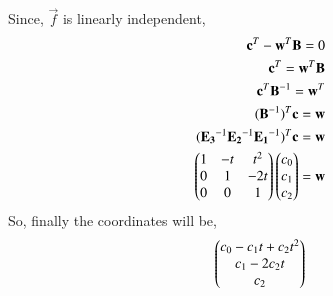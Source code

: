 \documentclass[journal,12pt,twocolumn]{IEEEtran}
\begin{document}
  Since, $\vec{f}$ is linearly independent,
  \begin{align}
  \mathbf{c}^T-\mathbf{w}^T\mathbf{B}=0\\
  \mathbf{c}^T=\mathbf{w}^T\mathbf{B}\\
  \mathbf{c}^T\mathbf{B}^{-1}=\mathbf{w}^T\\
   (\mathbf{B}^{-1})^T\mathbf{c}=\mathbf{w}\\
  (\mathbf{E_3}^{-1}\mathbf{E_2}^{-1}\mathbf{E_1}^{-1})^T\mathbf{c}=\mathbf{w}\\
  \begin{pmatrix}1&-t&t^2\\0&1&-2t\\0&0&1\end{pmatrix}\begin{pmatrix}c_0\\c_1\\c_2\end{pmatrix}=\mathbf{w}
  \end{align} 
  So, finally the coordinates will be,
  \begin{align}
  \begin{pmatrix}c_0-c_1t+c_2t^2\\c_1-2c_2t\\c_2\end{pmatrix}
  \end{align}
\end{document}
